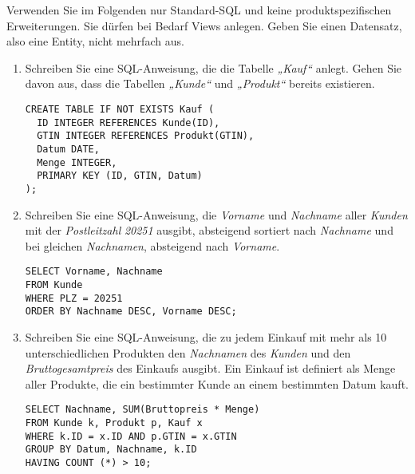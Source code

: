 \documentclass{lehramt-informatik-aufgabe}
\begin{document}
Verwenden Sie im Folgenden nur Standard-SQL und keine
produktspezifischen Erweiterungen. Sie dürfen bei Bedarf Views anlegen.
Geben Sie einen Datensatz, also eine Entity, nicht mehrfach aus.

\begin{enumerate}


\item Schreiben Sie eine SQL-Anweisung, die die Tabelle \emph{„Kauf“}
anlegt. Gehen Sie davon aus, dass die Tabellen \emph{„Kunde“} und
\emph{„Produkt“} bereits existieren.

\begin{liAntwort}
\begin{verbatim}
CREATE TABLE IF NOT EXISTS Kauf (
  ID INTEGER REFERENCES Kunde(ID),
  GTIN INTEGER REFERENCES Produkt(GTIN),
  Datum DATE,
  Menge INTEGER,
  PRIMARY KEY (ID, GTIN, Datum)
);
\end{verbatim}
\end{liAntwort}


\item Schreiben Sie eine SQL-Anweisung, die \emph{Vorname} und
\emph{Nachname} aller \emph{Kunden} mit der \emph{Postleitzahl}
\emph{20251} ausgibt, absteigend sortiert nach \emph{Nachname} und bei
gleichen \emph{Nachnamen}, absteigend nach \emph{Vorname}.

\begin{liAntwort}
\begin{verbatim}
SELECT Vorname, Nachname
FROM Kunde
WHERE PLZ = 20251
ORDER BY Nachname DESC, Vorname DESC;
\end{verbatim}
\end{liAntwort}


\item Schreiben Sie eine SQL-Anweisung, die zu jedem Einkauf mit mehr
als 10 unterschiedlichen Produkten den \emph{Nachnamen} des
\emph{Kunden} und den \emph{Bruttogesamtpreis} des Einkaufs ausgibt. Ein
Einkauf ist definiert als Menge aller Produkte, die ein bestimmter Kunde
an einem bestimmten Datum kauft.

\begin{liAntwort}
\begin{verbatim}
SELECT Nachname, SUM(Bruttopreis * Menge)
FROM Kunde k, Produkt p, Kauf x
WHERE k.ID = x.ID AND p.GTIN = x.GTIN
GROUP BY Datum, Nachname, k.ID
HAVING COUNT (*) > 10;
\end{verbatim}
\end{liAntwort}


\end{enumerate}
\end{document}
